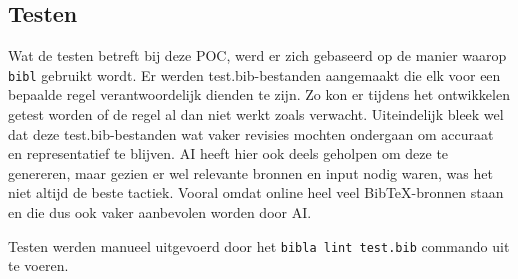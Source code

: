 \subsection{Testen}
Wat de testen betreft bij deze \acrlong{POC}, werd er zich gebaseerd op de manier waarop \texttt{bibl} gebruikt wordt. Er werden test.bib-bestanden aangemaakt die elk voor een bepaalde regel verantwoordelijk dienden te zijn. Zo kon er tijdens het ontwikkelen getest worden of de regel al dan niet werkt zoals verwacht. Uiteindelijk bleek wel dat deze test.bib-bestanden wat vaker revisies mochten ondergaan om accuraat en representatief te blijven. \acrshort{AI} heeft hier ook deels geholpen om deze te genereren, maar gezien er wel relevante bronnen en input nodig waren, was het niet altijd de beste tactiek. Vooral omdat online heel veel BibTeX-bronnen staan en die dus ook vaker aanbevolen worden door \acrshort{AI}.

Testen werden manueel uitgevoerd door het \texttt{bibla lint test.bib} commando uit te voeren.

